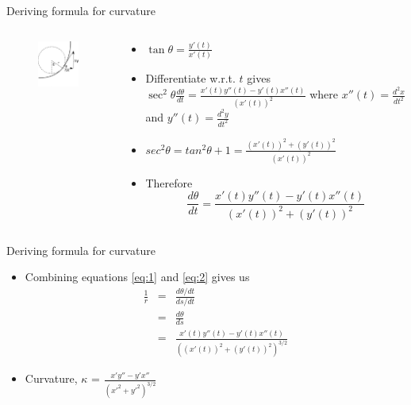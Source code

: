 \documentclass{beamer}
\begin{document}
\begin{frame}{Deriving formula for curvature}
	\begin{columns}
		\begin{column}{0.4\textwidth}			
			\begin{figure}
				\centering
				\includegraphics[width=40mm, scale=0.3]{curvature_illustration_2.png}
			\end{figure}
		\end{column}
		\begin{column}{0.75\textwidth}			

			\begin{itemize}
				\item $\tan \theta = \frac{y'(t)}{x'(t)}$ 
				\item Differentiate w.r.t. $t$ gives $\sec ^2 \theta \frac{d\theta}{dt} = \frac{x'(t) y''(t) - y'(t) x''(t)}{(x'(t))^2}$
				where $x''(t)=\frac{d^2 x}{dt^2}$ and $y''(t)=\frac{d^2 y}{dt^2}$
				\item $sec^2\theta = tan^2\theta +1 = \frac{{(x'(t))^2+(y'(t))^2}}{(x'(t))^2}$ 
				\item Therefore
				\begin{equation} \label{eq:2}
				\frac{d\theta}{dt}=\frac{x'(t) y''(t) - y'(t) x''(t)}{(x'(t))^2+(y'(t))^2}
				\end{equation}

			\end{itemize}
	\end{column}
\end{columns}
\end{frame}

\begin{frame}{Deriving formula for curvature}
	\begin{itemize}
		\item Combining equations \ref{eq:1} and \ref{eq:2} gives us
		\begin{eqnarray*}
			\frac1r &=& \frac{d\theta/dt}{ds/dt}  \\
			    &=& \frac{d\theta}{ds} \\
			    &=& \frac{x'(t) y''(t) - y'(t) x''(t)}{\left( (x'(t))^2 + (y'(t))^2 \right)^{3/2}}
		\end{eqnarray*}
		
		\item Curvature, $\kappa$ = $\frac{x' y'' - y' x''}{(x'^2+y'^2)^{3/2}} $
	\end{itemize}
	
\end{frame}
\end{document}
